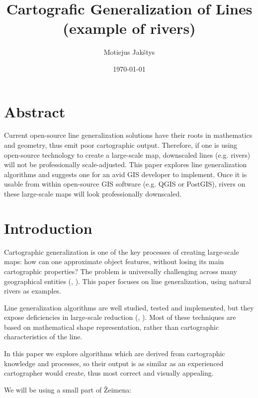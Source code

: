 \documentclass{article}
\title{
    Cartografic Generalization of Lines \\
    (example of rivers) \\ \vspace{4mm}
}
\author{Motiejus Jakštys}
\date{\today}
\begin{document}
\maketitle

\newpage

\section{Abstract}
\label{sec:abstract}

Current open-source line generalization solutions have their roots in
mathematics and geometry, thus emit poor cartographic output. Therefore, if one
is using open-source technology to create a large-scale map, downscaled lines
(e.g. rivers) will not be professionally scale-adjusted. This paper explores
line generalization algorithms and suggests one for an avid GIS developer to
implement. Once it is usable from within open-source GIS software (e.g. QGIS or
PostGIS), rivers on these large-scale maps will look professionally downscaled.

\section{Introduction}
\label{sec:introduction}

Cartographic generalization is one of the key processes of creating large-scale
maps: how can one approximate object features, without losing its main
cartographic properties? The problem is universally challenging across many
geographical entities (\cite{muller1991generalization},
\cite{mcmaster1992generalization}). This paper focuses on line generalization,
using natural rivers as examples.

Line generalization algorithms are well studied, tested and implemented, but
they expose deficiencies in large-scale reduction (\cite{monmonier1986toward},
\cite{mcmaster1993spatial}). Most of these techniques are based on mathematical
shape representation, rather than cartographic characteristics of the line.

In this paper we explore algorithms which are derived from cartographic
knowledge and processes, so their output is as similar as an experienced
cartographer would create, thus most correct and visually appealing.

We will be using a small part of Žeimena:
\end{document}
